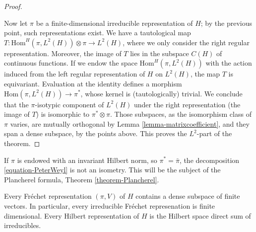 \begin{proof}
\begin{itemize}
\end{itemize}

Now let $\pi$ be a finite-dimensional irreducible representation of $H$; by the previous point, such representations exist. We have a tautological map $T:\text{Hom}^H(\pi, L^2(H)) \otimes \pi\to L^2(H)$, where we only consider the right regular representation. Moreover, the image of $T$ lies in the subspace $C(H)$ of continuous functions. If we endow the space $\text{Hom}^H(\pi, L^2(H))$ with the action induced from the left regular representation of $H$ on $L^2(H)$, the map $T$ is equivariant. Evaluation at the identity defines a morphism $\text{Hom}(\pi, L^2(H)) \to \pi^*$, whose kernel is (tautologically) trivial. We conclude that the $\pi$-isotypic component of $L^2(H)$ under the right representation (the image of $T$) is isomorphic to $\pi^*\otimes \pi$. Those subspaces, as the isomorphism class of $\pi$ varies, are mutually orthogonal by Lemma \ref{lemma-matrixcoefficient}, and they span a dense subspace, by the points above. This proves the $L^2$-part of the theorem.




\end{proof}


\begin{remark}
\label{remark-peterweyl-not-isometry}
 If $\pi$ is endowed with an invariant Hilbert norm, so $\pi^*= \bar\pi$, the decomposition \eqref{equation-PeterWeyl} is not an isometry. This will be the subject of the Plancherel formula, Theorem \ref{theorem-Plancherel}.
\end{remark}


\begin{theorem}
\label{theorem-PeterWeyl-general}
 Every Fr\'echet representation $(\pi,V)$ of $H$ contains a dense subspace of finite vectors. In particular, every irreducible Fr\'echet represenation is finite dimensional. Every Hilbert representation of $H$ is the Hilbert space direct sum of irreducibles.
\end{theorem}


